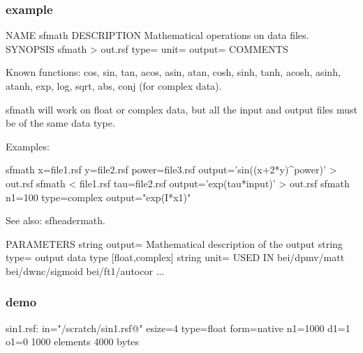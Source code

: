 \begin{frame}[fragile] \frametitle{example}

  \tiny
\begin{semiverbatim}
NAME
        sfmath
DESCRIPTION
        Mathematical operations on data files.
SYNOPSIS
        sfmath > out.rsf type= unit= output=
COMMENTS

        Known functions: cos,  sin,  tan,  acos,  asin,  atan,
                         cosh, sinh, tanh, acosh, asinh, atanh,
                         exp,  log,  sqrt, abs, conj (for complex data).

        sfmath will work on float or complex data, but all the input and output
        files must be of the same data type.

        Examples:

        sfmath x=file1.rsf y=file2.rsf power=file3.rsf output='sin((x+2*y)^power)' > out.rsf
        sfmath < file1.rsf tau=file2.rsf output='exp(tau*input)' > out.rsf
        sfmath n1=100 type=complex output="exp(I*x1)"

        See also: sfheadermath.

PARAMETERS
        string  output=         Mathematical description of the output
        string  type=   output data type [float,complex]
        string  unit=
USED IN
        bei/dpmv/matt
        bei/dwnc/sigmoid
        bei/ft1/autocor
	...
\end{semiverbatim}
\end{frame}
\cwpnote{}

\begin{frame}[fragile] \frametitle{demo}

  
  \vfill
  
  \tiny
\begin{semiverbatim}
sin1.rsf:
    in="/scratch/sin1.rsf@"
    esize=4 type=float form=native
    n1=1000        d1=1           o1=0
        1000 elements 4000 bytes
\end{semiverbatim}
\normalsize

\end{frame}
\cwpnote{}

